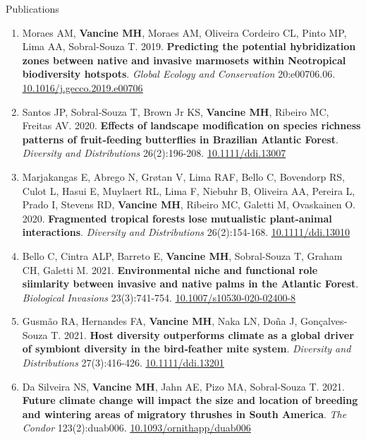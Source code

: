 \documentclass{resume}
\begin{document}
\begin{rSection}{Publications}
\begin{enumerate}
\item Moraes AM, {\bf Vancine MH}, Moraes AM, Oliveira Cordeiro CL, Pinto MP, Lima AA, Sobral-Souza T. 2019. {\bf Predicting the potential hybridization zones between native and invasive marmosets within Neotropical biodiversity hotspots}. {\it Global Ecology and Conservation} 20:e00706.06. \href{https://doi.org/10.1016/j.gecco.2019.e00706}{\underline{10.1016/j.gecco.2019.e00706}}

\item Santos JP, Sobral‐Souza T, Brown Jr KS, {\bf Vancine MH}, Ribeiro MC, Freitas AV. 2020. {\bf Effects of landscape modification on species richness patterns of fruit‐feeding butterflies in Brazilian Atlantic Forest}. {\it Diversity and Distributions} 26(2):196-208. \href{https://doi.org/10.1111/ddi.13007}{\underline{10.1111/ddi.13007}}

\item Marjakangas E, Abrego N, Grøtan V, Lima RAF, Bello C, Bovendorp RS, Culot L, Hasui E, Muylaert RL, Lima F, Niebuhr B, Oliveira AA, Pereira L, Prado I, Stevens RD, {\bf Vancine MH}, Ribeiro MC, Galetti M, Ovaskainen O. 2020. {\bf Fragmented tropical forests lose mutualistic plant-animal interactions}. {\it Diversity and Distributions} 26(2):154-168. \href{https://doi.org/10.1111/ddi.13010}{\underline{10.1111/ddi.13010}}

\item Bello C, Cintra ALP, Barreto E, {\bf Vancine MH}, Sobral-Souza T, Graham CH, Galetti M. 2021. {\bf Environmental niche and functional role siimlarity between invasive and native palms in the Atlantic Forest}. {\it Biological Invasions} 23(3):741-754. \href{https://doi.org/10.1007/s10530-020-02400-8}{\underline{10.1007/s10530-020-02400-8}}

\item Gusmão RA, Hernandes FA, {\bf Vancine MH}, Naka LN, Doña J, Gonçalves‐Souza T. 2021. {\bf Host diversity outperforms climate as a global driver of symbiont diversity in the bird‐feather mite system}. {\it Diversity and Distributions} 27(3):416-426. \href{https://doi.org/10.1111/ddi.13201}{\underline{10.1111/ddi.13201}}

\item Da Silveira NS, {\bf Vancine MH}, Jahn AE, Pizo MA, Sobral-Souza T. 2021. {\bf Future climate change will impact the size and location of breeding and wintering areas of migratory thrushes in South America}. {\it The Condor} 123(2):duab006. \href{https://doi.org/10.1093/ornithapp/duab006}{\underline{10.1093/ornithapp/duab006}}


\end{enumerate}
\end{rSection}
\end{document}
